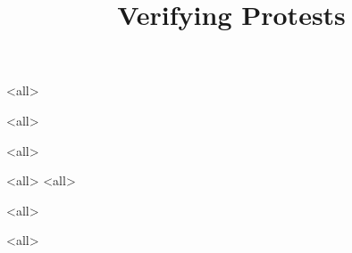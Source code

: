 \title{%
  Verifying Protests
}

\maketitle

\mode*

\begin{abstract}
  
\end{abstract}

\clearpage
\tableofcontents
\clearpage

\mode<all>


\mode<all>

\mode<all>


\mode<all>
%
\mode<all>
%

\mode<all>

\mode<all>




\begin{frame}[allowframebreaks]
  \printbibliography{}
\end{frame}
